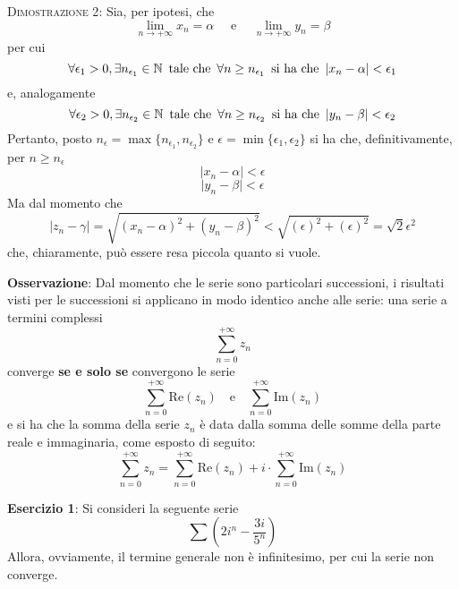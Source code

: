 \documentclass[a4paper]{extarticle}
\begin{document}
\vspace{2em}
\noindent
\normalfont \normalsize
\textsc{Dimostrazione 2}: Sia, per ipotesi, che
\[\lim_{n \to +\infty} x_n = \alpha \hspace{1em} \text{ e } \hspace{1em} \lim_{n \to + \infty} y_n = \beta\]
per cui
\[\forall \epsilon_1 > 0, \exists n_{\epsilon_1} \in \mathbb{N} \hspace{0.5em} \text{tale che} \hspace{0.5em} \forall n \geq n_{\epsilon_1} \hspace{0.5em} \text{si ha che} \hspace{0.5em} \vert x_n - \alpha \vert < \epsilon_1\]
e, analogamente
\[\forall \epsilon_2 > 0, \exists n_{\epsilon_2} \in \mathbb{N} \hspace{0.5em} \text{tale che} \hspace{0.5em} \forall n \geq n_{\epsilon_2} \hspace{0.5em} \text{si ha che} \hspace{0.5em} \vert y_n - \beta \vert < \epsilon_2\]
Pertanto, posto $n_\epsilon = \max \{n_{\epsilon_1},n_{\epsilon_2}\}$ e $\epsilon = \min \{\epsilon_1,\epsilon_2\}$ si ha che, definitivamente, per $n \geq n_\epsilon$
\[\vert x_n - \alpha \vert < \epsilon\]
\[\vert y_n - \beta  \vert < \epsilon\]
Ma dal momento che
\[\vert z_n - \gamma \vert = \sqrt{(x_n-\alpha)^2+(y_n-\beta)^2} < \sqrt{(\epsilon)^2+(\epsilon)^2} = \sqrt{2} \epsilon^2\]
che, chiaramente, può essere resa piccola quanto si vuole.

\vspace{1em}
\noindent
\textbf{Osservazione}: Dal momento che le serie sono particolari successioni, i risultati visti per le successioni si applicano in modo identico anche alle serie: una serie a termini complessi
\[\sum_{n=0}^{+\infty} z_n\]
converge \textbf{se e solo se} convergono le serie
\[\sum_{n=0}^{+\infty} \text{Re}(z_n) \hspace{1em} \text{e} \hspace{1em} \sum_{n=0}^{+\infty} \text{Im}(z_n)\]
e si ha che la somma della serie $z_n$ è data dalla somma delle somme della parte reale e immaginaria, come esposto di seguito:
\[\sum_{n=0}^{+\infty} z_n = \sum_{n=0}^{+\infty} \text{Re}(z_n) + i \cdot \sum_{n=0}^{+\infty} \text{Im}(z_n)\]

\vspace{1em}
\noindent
\textbf{Esercizio 1}: Si consideri la seguente serie
\[\sum \left(2 i^n-\frac{3 i}{5^n}\right)\]
Allora, ovviamente, il termine generale non è infinitesimo, per cui la serie non converge.
\end{document}
